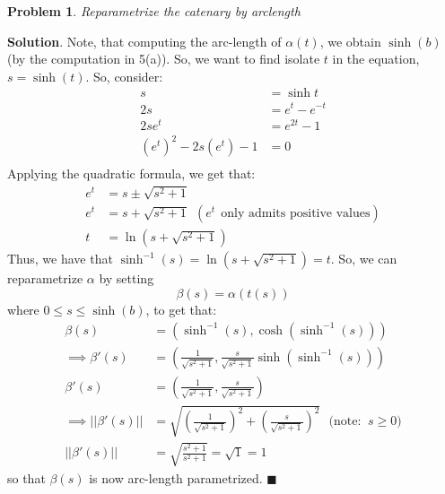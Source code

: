 \documentclass[12pt]{article}
\newcommand{\abs}[1]{\left| #1 \right|} %
\renewcommand{\=}[1]{\stackrel{#1}{=}} %
\newtheorem{p}{Problem}[section]
\theoremstyle{definition}
\newenvironment{s}{%
        \begin{trivlist} \item \textbf{Solution}. }{%
            \hspace*{\fill} $\blacksquare$\end{trivlist}}%
\begin{document}
\begin{p}
    Reparametrize the catenary by arclength
\end{p}
\begin{s}
    Note, that computing the arc-length of $\alpha(t)$, we obtain $\sinh(b)$ (by the computation in 5(a)).
    So, we want to find isolate $t$ in the equation, $s = \sinh(t)$.
    So, consider:
    \begin{align*}
        s &= \sinh t \\
        2s &= e^t - e^{-t} \\
        2se^t &= e^{2t} - 1 \\
        (e^t)^2 - 2s(e^t) - 1 &= 0 \\
    \end{align*}
    Applying the quadratic formula, we get that:
    \begin{align*}
        e^t &= s \pm \sqrt{s^2 + 1} \\
        e^t &= s + \sqrt{s^2+1}\:\: (e^t\:\: \text{only admits positive values}) \\
        t &= \ln(s + \sqrt{s^2+1})
    \end{align*}
    Thus, we have that $\sinh^{-1}(s) = \ln(s+\sqrt{s^2+1}) = t$. So, we can reparametrize $\alpha$ by
    setting
    \[ \beta(s) = \alpha(t(s)) \]
    where $0 \leq s \leq \sinh(b)$, to get that:
    \begin{align*}
        \beta(s) &= (\sinh^{-1}(s), \cosh(\sinh^{-1}(s))) \\
        \implies \beta'(s) &= (\frac{1}{\sqrt{s^2+1}}, \frac{s}{\sqrt{s^2+1}}\sinh(\sinh^{-1}(s))) \\
        \beta'(s) &= (\frac{1}{\sqrt{s^2+1}}, \frac{s}{\sqrt{s^2+1}}) \\
        \implies \abs{\abs{\beta'(s)}} &= \sqrt{ (\frac{1}{\sqrt{s^2+1}})^2 + (\frac{s}{\sqrt{s^2+1}})^2 }\:\:\:\text{(note: }\: s\geq 0)\\
        \abs{\abs{\beta'(s)}} &= \sqrt{\frac{s^2+1}{s^2+1}} = \sqrt{1} = 1
    \end{align*}
    so that $\beta(s)$ is now arc-length parametrized.
\end{s}
\end{document}
